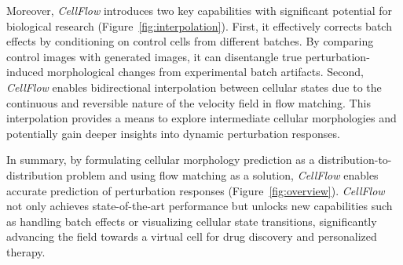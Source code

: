 Moreover, \emph{CellFlow} introduces two key capabilities with significant potential for biological research (Figure~\ref{fig:interpolation}). First, it effectively corrects batch effects by conditioning on control cells from different batches. By comparing control images with generated images, it can disentangle true perturbation-induced morphological changes from experimental batch artifacts. Second, \emph{CellFlow} enables bidirectional interpolation between cellular states due to the continuous and reversible nature of the velocity field in flow matching. This interpolation provides a means to explore intermediate cellular morphologies and potentially gain deeper insights into dynamic perturbation responses.

In summary, by formulating cellular morphology prediction as a distribution-to-distribution problem and using flow matching as a solution, \emph{CellFlow} enables accurate prediction of perturbation responses (Figure~\ref{fig:overview}). \emph{CellFlow} not only achieves state-of-the-art performance but unlocks new capabilities such as handling batch effects or visualizing cellular state transitions, significantly advancing the field towards a virtual cell for drug discovery and personalized therapy.
